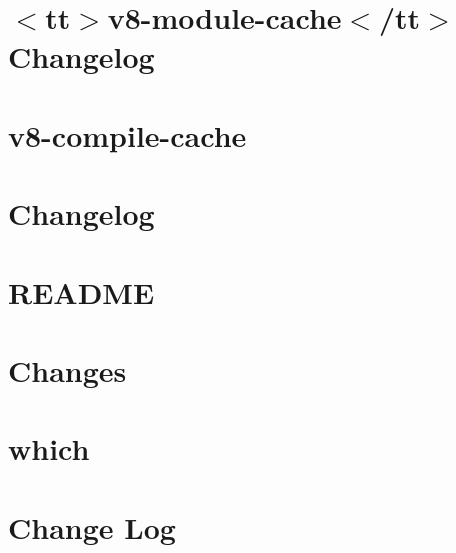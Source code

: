 \let\mypdfximage\pdfximage\def\pdfximage{\immediate\mypdfximage}\documentclass[twoside]{book}
\newcommand{\+}{\discretionary{\mbox{\scriptsize$\hookleftarrow$}}{}{}}
\begin{document}
\chapter{$<$tt$>$v8-\/module-\/cache$<$/tt$>$ Changelog}
\label{md_heap-visualizer_node_modules_v8-compile-cache__c_h_a_n_g_e_l_o_g}

\chapter{v8-\/compile-\/cache}
\label{md_heap-visualizer_node_modules_v8-compile-cache__r_e_a_d_m_e}

\chapter{Changelog}
\label{md_heap-visualizer_node_modules_vscode-test__c_h_a_n_g_e_l_o_g}

\chapter{R\+E\+A\+D\+ME}
\label{md_heap-visualizer_node_modules_vscode-test__r_e_a_d_m_e}

\chapter{Changes}
\label{md_heap-visualizer_node_modules_which__c_h_a_n_g_e_l_o_g}

\chapter{which}
\label{md_heap-visualizer_node_modules_which__r_e_a_d_m_e}

\chapter{Change Log}
\label{md_heap-visualizer_node_modules_which-module__c_h_a_n_g_e_l_o_g}

\end{document}

